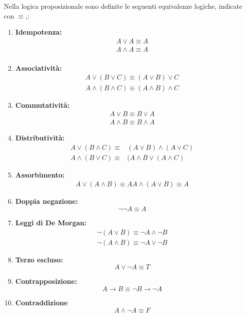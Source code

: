 \documentclass[a4paper,12pt, oneside]{book}
\begin{document}
Nella logica proposizionale sono definite le seguenti equivalenze logiche,
indicate con $\equiv$,: 
\begin{enumerate}
  \item \textbf{Idempotenza:}
  \begin{align*}
    A \lor A  \equiv  A \\
    A \land A  \equiv  A \\
  \end{align*}
  \item \textbf{Associatività:}
  \begin{align*}
    A \lor (B \lor C) \equiv  (A \lor B) \lor C \\
    A \land (B \land C)  \equiv  (A \land B) \land C
  \end{align*}
  \item \textbf{Commutatività:}
  \begin{align*}
    A \lor B  \equiv  B \lor A \\
    A \land B  \equiv  B \land A
  \end{align*}
  \item \textbf{Distributività:}
  \begin{align*}
    A \lor (B \land C)  \equiv & (A \lor B) \land (A \lor C)\\
    A \land (B \lor C)  \equiv & (A \land B \lor (A \land C)
  \end{align*}
  \item \textbf{Assorbimento:}
  \begin{align*}
    A \lor (A \land B)  \equiv  A
    A \land (A \lor B)  \equiv  A
  \end{align*}
  \item \textbf{Doppia negazione:}
  \begin{equation*}
    \neg \neg A \equiv A
  \end{equation*}
  \item\textbf{ Leggi di De Morgan:}
  \begin{align*}
    \neg (A \lor B)  \equiv  \neg A \land \neg B \\
    \neg(A \land B)  \equiv  \neg A \lor \neg B
  \end{align*}
  \item \textbf{Terzo escluso:}
  \begin{equation*}
    A \lor \neg A \equiv T
  \end{equation*}
  \item \textbf{Contrapposizione:}
  \begin{equation*}
    A \rightarrow B \equiv \neg B \rightarrow \neg A
  \end{equation*}
  \item \textbf{Contraddizione}
  \begin{equation*}
    A \land \neg A \equiv F
  \end{equation*}
\end{enumerate}
\end{document}
